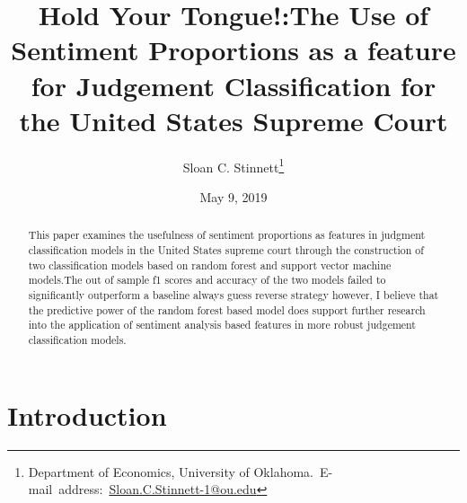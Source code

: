 \documentclass[12pt,english]{article}
\begin{document}
\begin{singlespace}
\title{Hold Your Tongue!:The Use of Sentiment Proportions as a feature for Judgement Classification for the United States Supreme Court}
\end{singlespace}

\author{Sloan C. Stinnett\thanks{Department of Economics, University of Oklahoma.\
E-mail~address:~\href{mailto:student.name@ou.edu}{Sloan.C.Stinnett-1@ou.edu}}}

\date{May 9, 2019}

\maketitle

\begin{abstract}
\begin{singlespace}
This paper examines the usefulness of sentiment proportions as features in judgment classification models in the United States supreme court through the construction of two classification models based on random forest and support vector machine models.The out of sample f1 scores and accuracy of the two models failed to significantly outperform a baseline always guess reverse strategy however, I believe that the predictive power of the random forest based model does support further research into the application of sentiment analysis based features in more robust judgement classification models.

\end{singlespace}
\end{abstract}
\vfill{}


\pagebreak{}
\maketitle

\section{Introduction}
\end{document}

